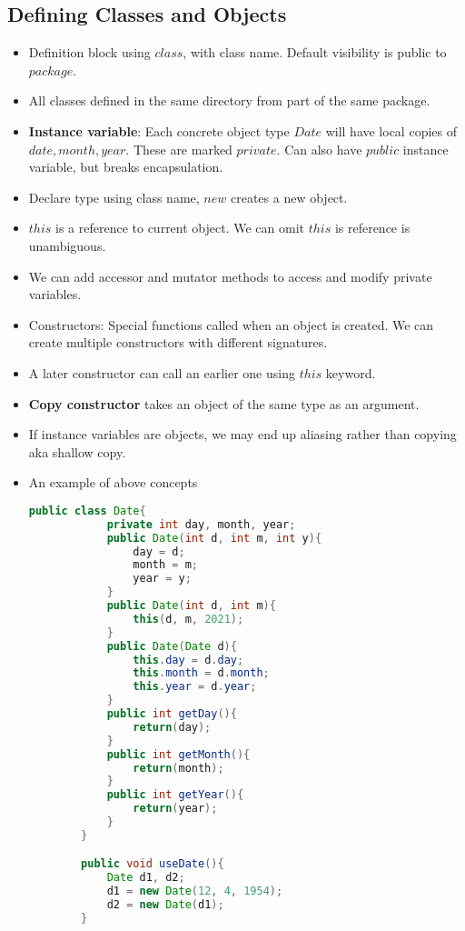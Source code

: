 \documentclass[a4paper]{article}
\begin{document}
\subsection{Defining Classes and Objects}
\begin{itemize}
    \item Definition block using $class$, with class name. Default visibility is public to $package$.
    \item All classes defined in the same directory from part of the same package.
    \item \textbf{Instance variable}: Each concrete object type $Date$ will have local copies of $date,month,year$. These are marked $private$. Can also have $public$ instance variable, but breaks encapsulation.
    \item Declare type using class name, $new$ creates a new object.
    \item $this$ is a reference to current object. We can omit $this$ is reference is unambiguous.
    \item We can add accessor and mutator methods to access and modify private variables.
    \item Constructors: Special functions called when an object is created. We can create multiple constructors with different signatures.
    \item A later constructor can call an earlier one using $this$ keyword.
    \item \textbf{Copy constructor} takes an object of the same type as an argument.
    \item If instance variables are objects, we may end up aliasing rather than copying aka shallow copy.
    \item An example of above concepts
    \begin{lstlisting}[language=Java]
        public class Date{
            private int day, month, year;
            public Date(int d, int m, int y){
                day = d;
                month = m;
                year = y;
            }
            public Date(int d, int m){
                this(d, m, 2021);
            }
            public Date(Date d){
                this.day = d.day;
                this.month = d.month;
                this.year = d.year;
            }
            public int getDay(){
                return(day);
            }
            public int getMonth(){
                return(month);
            }
            public int getYear(){
                return(year);
            }
        }

        public void useDate(){
            Date d1, d2;
            d1 = new Date(12, 4, 1954);
            d2 = new Date(d1);
        }
    \end{lstlisting}
\end{itemize}
\end{document}
